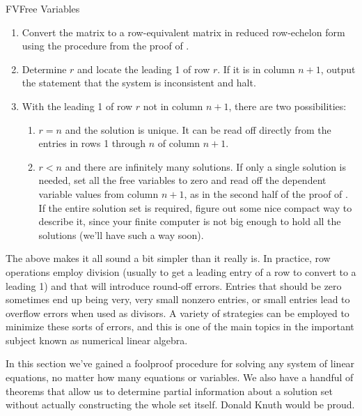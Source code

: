 \begin{subsect}{FV}{Free Variables}
\begin{para}
\begin{enumerate}
\item  Convert the matrix to a row-equivalent matrix in reduced row-echelon form using the procedure from the proof of .
\item  Determine $r$ and locate the leading 1 of row $r$.  If it is in column $n+1$, output the statement that the system is inconsistent and halt.
\item With the leading 1 of row $r$ not in column $n+1$, there are two possibilities:
\begin{enumerate}
\item $r=n$ and the solution is unique.  It can be read off directly from the entries in rows 1 through $n$ of column $n+1$.
\item
$r<n$ and there are infinitely many solutions.
If only a single solution is needed, set all the free variables to zero and read off the dependent variable values from column $n+1$, as in the second half of the proof of .  If the entire solution set is required, figure out some nice compact way to describe it, since your finite computer is not big enough to hold all the solutions (we'll have such a way soon).
\end{enumerate}
\end{enumerate}
\end{para}
%
\begin{para}The above makes it all sound a bit simpler than it really is.  In practice, row operations employ division (usually to get a leading entry of a row to convert to a leading 1) and that will introduce round-off errors.  Entries that should be zero sometimes end up being very, very small nonzero entries, or small entries lead to overflow errors when used as divisors.  A variety of strategies can be employed to minimize these sorts of errors, and this is one of the main topics in the important subject known as numerical linear algebra.\end{para}
%
\begin{para}In this section we've gained a foolproof procedure for solving any system of linear equations, no matter how many equations or variables.  We also have a handful of theorems that allow us to determine partial information about a solution set without actually constructing the whole set itself.  Donald Knuth would be proud.\end{para}
%
%
\end{subsect}
%


